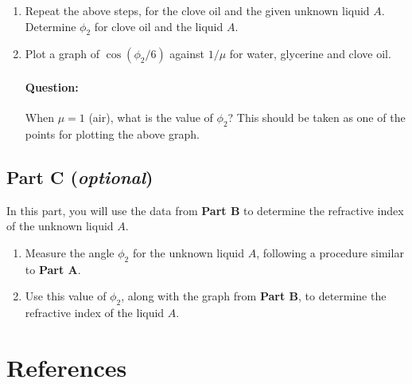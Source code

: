 \begin{refsection}
\begin{enumerate}
    \item Repeat the above steps, for the clove oil and the given unknown liquid $A$. Determine $\phi_2$ for clove oil and the liquid $A$.
    
    \item Plot a graph of $\cos(\phi_2 / 6)$ against $1/\mu$ for water, glycerine and clove oil. 
    
    \begin{question}
    \paragraph{Question:} When $\mu = 1$ (air), what is the value of $\phi_2$? This should be taken as one of the points for plotting the above graph.
    \end{question}

\end{enumerate}

  
 

\subsection*{Part C (\textit{optional})}


In this part, you will use the data from \textbf{Part B} to determine the refractive index of the unknown liquid $A$. 

\begin{enumerate}
    \item Measure the angle $\phi_2$ for the unknown liquid $A$, following a procedure similar to \textbf{Part A}.
    
    \item Use this value of $\phi_2$, along with the graph from \textbf{Part B}, to determine the refractive index of the liquid $A$.
\end{enumerate}



\section*{References}


\end{refsection}
